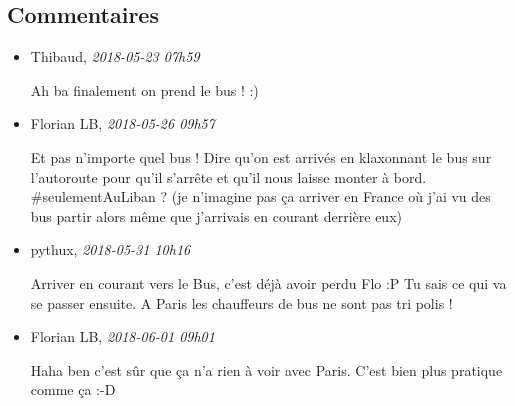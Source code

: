 \hypertarget{commentaires}{%
\subsection{Commentaires}\label{commentaires}}

\begin{itemize}
\item
  Thibaud, \emph{2018-05-23 07h59}

  Ah ba finalement on prend le bus ! :)
\item
  Florian LB, \emph{2018-05-26 09h57}

  Et pas n'importe quel bus ! Dire qu'on est arrivés en klaxonnant le
  bus sur l'autoroute pour qu'il s'arrête et qu'il nous laisse monter à
  bord. \#seulementAuLiban ? (je n'imagine pas ça arriver en France où
  j'ai vu des bus partir alors même que j'arrivais en courant derrière
  eux)
\item
  pythux, \emph{2018-05-31 10h16}

  Arriver en courant vers le Bus, c'est déjà avoir perdu Flo :P Tu sais
  ce qui va se passer ensuite. A Paris les chauffeurs de bus ne sont pas
  tri polis !
\item
  Florian LB, \emph{2018-06-01 09h01}

  Haha ben c'est sûr que ça n'a rien à voir avec Paris. C'est bien plus
  pratique comme ça :-D
\end{itemize}
